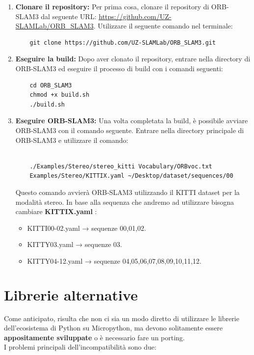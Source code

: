 \documentclass[12pt,a4paper]{report}
\begin{document}
\begin{enumerate}
    \item \textbf{Clonare il repository:} Per prima cosa, clonare il repository di ORB-SLAM3 dal seguente URL: \url{https://github.com/UZ-SLAMLab/ORB_SLAM3}. Utilizzare il seguente comando nel terminale:

    \begin{verbatim}
    git clone https://github.com/UZ-SLAMLab/ORB_SLAM3.git
    \end{verbatim}

    \item \textbf{Eseguire la build:} Dopo aver clonato il repository, entrare nella directory di ORB-SLAM3 ed eseguire il processo di build con i comandi seguenti:

    \begin{verbatim}
    cd ORB_SLAM3
    chmod +x build.sh
    ./build.sh
    \end{verbatim}

    \item \textbf{Eseguire ORB-SLAM3:} Una volta completata la build, è possibile avviare ORB-SLAM3 con il comando seguente. Entrare nella directory principale di ORB-SLAM3 e utilizzare il comando:

    \noindent
    \begin{verbatim}
    
    ./Examples/Stereo/stereo_kitti Vocabulary/ORBvoc.txt 
    Examples/Stereo/KITTIX.yaml ~/Desktop/dataset/sequences/00
    \end{verbatim}

    Questo comando avvierà ORB-SLAM3 utilizzando il KITTI dataset per la modalità stereo.
    In base alla sequenza che andremo ad utilizzare bisogna cambiare \textbf{KITTIX.yaml} : 
    \begin{itemize}
        \item  KITTI00-02.yaml → sequenze 00,01,02.
        \item KITTY03.yaml → sequenze 03.
        \item KITTY04-12.yaml → sequenze 04,05,06,07,08,09,10,11,12.
    \end{itemize}
\end{enumerate}


\section{Librerie alternative}

Come anticipato, risulta che non ci sia un modo diretto di utilizzare
le librerie dell'ecosistema di Python su Micropython, ma
devono solitamente essere \textbf{appositamente sviluppate} o è
necessario fare un porting.\\
I problemi principali dell'incompatibilità sono due:
\end{document}
